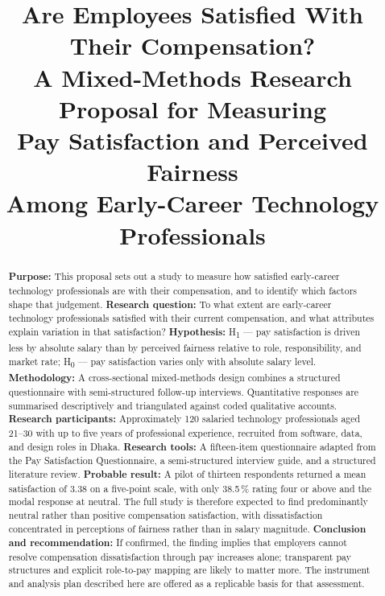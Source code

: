 \documentclass[conference]{IEEEtran}
\begin{document}
\title{Are Employees Satisfied With Their Compensation?\\
A Mixed-Methods Research Proposal for Measuring\\
Pay Satisfaction and Perceived Fairness\\
Among Early-Career Technology Professionals}

\author{
}

\maketitle

\begin{abstract}
\textbf{Purpose:} This proposal sets out a study to measure how satisfied
early-career technology professionals are with their compensation, and to
identify which factors shape that judgement.
\textbf{Research question:} To what extent are early-career technology
professionals satisfied with their current compensation, and what
attributes explain variation in that satisfaction?
\textbf{Hypothesis:} H\textsubscript{1} --- pay satisfaction is driven less
by absolute salary than by perceived fairness relative to role,
responsibility, and market rate; H\textsubscript{0} --- pay satisfaction
varies only with absolute salary level.
\textbf{Methodology:} A cross-sectional mixed-methods design combines a
structured questionnaire with semi-structured follow-up interviews.
Quantitative responses are summarised descriptively and triangulated
against coded qualitative accounts.
\textbf{Research participants:} Approximately 120 salaried technology
professionals aged 21--30 with up to five years of professional
experience, recruited from software, data, and design roles in Dhaka.
\textbf{Research tools:} A fifteen-item questionnaire adapted from the
Pay Satisfaction Questionnaire, a semi-structured interview guide, and a
structured literature review.
\textbf{Probable result:} A pilot of thirteen respondents returned a mean
satisfaction of 3.38 on a five-point scale, with only 38.5\,\% rating
four or above and the modal response at neutral. The full study is
therefore expected to find predominantly neutral rather than positive
compensation satisfaction, with dissatisfaction concentrated in
perceptions of fairness rather than in salary magnitude.
\textbf{Conclusion and recommendation:} If confirmed, the finding implies
that employers cannot resolve compensation dissatisfaction through pay
increases alone; transparent pay structures and explicit role-to-pay
mapping are likely to matter more. The instrument and analysis plan
described here are offered as a replicable basis for that assessment.
\end{abstract}
\end{document}
